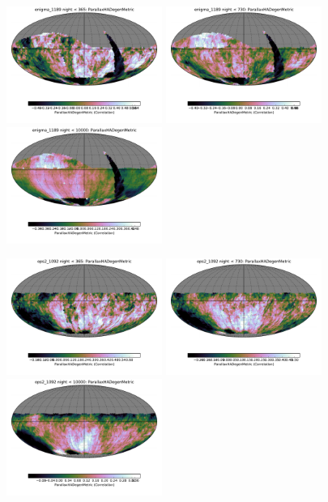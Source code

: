 \begin{figure}[ht]
  \begin{center}
  \includegraphics[width=2.0in]{./figs/milkyway/MW_Astrom_paDegen_1189_01y_map.pdf}
  \includegraphics[width=2.0in]{./figs/milkyway/MW_Astrom_paDegen_1189_02y_map.pdf}
  \includegraphics[width=2.0in]{./figs/milkyway/MW_Astrom_paDegen_1189_10y_map.pdf}
  \end{center}
  \begin{center}
  \includegraphics[width=2.0in]{./figs/milkyway/MW_Astrom_paDegen_1092_01y_map.pdf}
  \includegraphics[width=2.0in]{./figs/milkyway/MW_Astrom_paDegen_1092_02y_map.pdf}
  \includegraphics[width=2.0in]{./figs/milkyway/MW_Astrom_paDegen_1092_10y_map.pdf}
  \end{center}


\end{figure}
